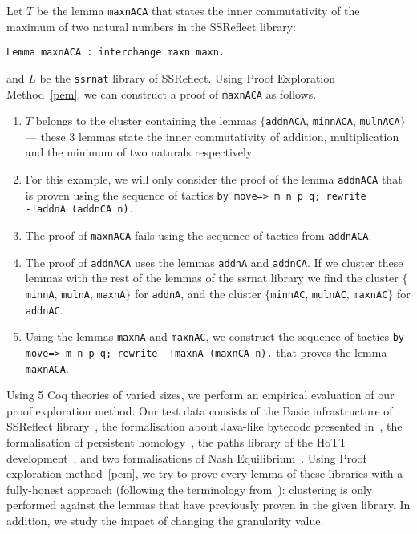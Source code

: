 \begin{example}\label{ex:maxnACA}
Let $T$ be the lemma \lstinline?maxnACA? that states the inner commutativity of the maximum of two natural numbers in the SSReflect library:

\begin{lstlisting}
Lemma maxnACA : interchange maxn maxn. 
\end{lstlisting}

\noindent and $L$ be the \lstinline?ssrnat? library of SSReflect. Using Proof Exploration Method~\ref{pem}, we can construct a 
proof of \lstinline?maxnACA? as follows. 

\begin{enumerate}
 \item $T$ belongs to the cluster containing the lemmas $\{$\lstinline?addnACA?, \lstinline?minnACA?, \lstinline?mulnACA?$\}$ --- these
 3 lemmas state the inner commutativity of addition, multiplication and the minimum of two naturals respectively. 
 \item For this example, we will only consider the proof of the lemma \lstinline?addnACA? that is proven using the sequence of tactics \lstinline?by move=> m n p q; rewrite -!addnA (addnCA n).?
 \item The proof of \lstinline?maxnACA? fails using the sequence of tactics from \lstinline?addnACA?.
 \item The proof of \lstinline?addnACA? uses the lemmas \lstinline?addnA? and \lstinline?addnCA?. If we cluster these lemmas with the
 rest of the lemmas of the ssrnat library we find the cluster $\{$\lstinline?minnA?, \lstinline?mulnA?, \lstinline?maxnA?$\}$ for 
 \lstinline?addnA?, and the cluster $\{$\lstinline?minnAC?, \lstinline?mulnAC?, \lstinline?maxnAC?$\}$ for 
 \lstinline?addnAC?. 
 \item Using the lemmas \lstinline?maxnA? and \lstinline?maxnAC?, we construct the sequence of tactics \lstinline?by move=> m n p q; rewrite -!maxnA (maxnCA n).? that proves the lemma \lstinline?maxnACA?.
\end{enumerate}
 
\end{example}


Using 5 Coq theories of varied sizes, we perform an empirical evaluation of our proof exploration method. Our test data consists of the Basic infrastructure of SSReflect library~\cite{SSReflect}, the formalisation about Java-like bytecode presented in~\cite{HK14}, the formalisation of persistent homology~\cite{HCMS12}, the paths library of the HoTT development~\cite{hottbook}, and two formalisations of Nash Equilibrium~\cite{Ves06,nash}. Using Proof exploration method~\ref{pem}, we try to prove every lemma of these libraries with a fully-honest approach (following the terminology from~\cite{KaliszykU14}): clustering is only performed against the lemmas that have previously
proven in the given library. In addition, we study the impact of changing the granularity value.

